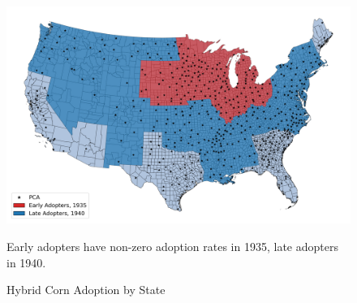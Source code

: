 \documentclass[12pt]{article}
\begin{document}
\begin{appendices}
\begin{figure}
    \centering
    \caption{Hybrid Corn Adoption by State}
    \label{corn_map}
\includegraphics[width=\textwidth]{corn_map.png}

Early adopters have non-zero adoption rates in 1935, late adopters in 1940.
\end{figure}


\end{appendices}
\end{document}
